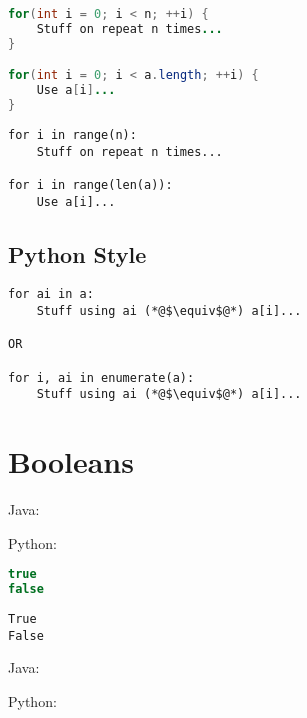 \documentclass{article}
\begin{document}
\begin{minipage}{0.45\linewidth}
    \begin{lstlisting}[language=Java]
for(int i = 0; i < n; ++i) {
    Stuff on repeat n times...
}

for(int i = 0; i < a.length; ++i) {
    Use a[i]...
}
    \end{lstlisting}
\end{minipage}
\hfill
\begin{minipage}{0.45\linewidth}
    \begin{lstlisting}
for i in range(n):
    Stuff on repeat n times...

for i in range(len(a)):
    Use a[i]...
    \end{lstlisting}
\end{minipage}

\subsection{Python Style}
\begin{lstlisting}
for ai in a:
    Stuff using ai (*@$\equiv$@*) a[i]...

OR

for i, ai in enumerate(a):
    Stuff using ai (*@$\equiv$@*) a[i]...
\end{lstlisting}

\section{Booleans}
\begin{minipage}{0.45\linewidth}
    Java:
\end{minipage}
\hfill
\begin{minipage}{0.45\linewidth}
    Python:
\end{minipage}

\begin{minipage}{0.45\linewidth}
    \begin{lstlisting}[language=Java]
true
false
    \end{lstlisting}
\end{minipage}
\hfill
\begin{minipage}{0.45\linewidth}
    \begin{lstlisting}
True
False
    \end{lstlisting}
\end{minipage}

\begin{minipage}{0.45\linewidth}
    Java:
\end{minipage}
\hfill
\begin{minipage}{0.45\linewidth}
    Python:
\end{minipage}
\end{document}
